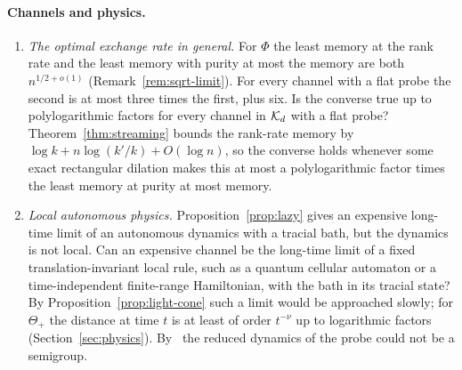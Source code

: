 \paragraph{Channels and physics.}

\begin{enumerate}[label=(\arabic*),resume]
\item \emph{The optimal exchange rate in general.} For $\Phi$ the least memory at the rank rate and the least memory with purity at most the
memory are both $n^{1/2+o(1)}$ (Remark~\ref{rem:sqrt-limit}). For every channel with a flat probe the second is at most three times the first, plus
six. Is the converse true up to polylogarithmic factors for every channel in $\mathcal K_d$ with a flat probe? Theorem~\ref{thm:streaming} bounds the
rank-rate memory by $\log k+n\log(k'/k)+O(\log n)$, so the converse holds whenever some exact rectangular dilation makes this at most a
polylogarithmic factor times the least memory at purity at most memory.
\item \emph{Local autonomous physics.} Proposition~\ref{prop:lazy} gives an expensive long-time limit of an autonomous dynamics with a tracial
bath, but the dynamics is not local. Can an expensive channel be the long-time limit of a fixed translation-invariant local rule, such as a
quantum cellular automaton or a time-independent finite-range Hamiltonian, with the bath in its tracial state? By Proposition~\ref{prop:light-cone}
such a limit would be approached slowly; for $\Theta_+$ the distance at time $t$ is at least of order $t^{-\nu}$ up to logarithmic factors
(Section~\ref{sec:physics}). By~\cite{BhatDevendra2025} the reduced dynamics of the probe could not be a semigroup.
\end{enumerate}
